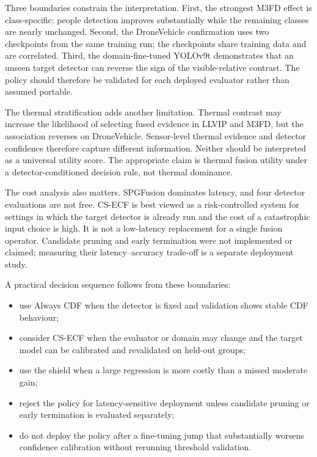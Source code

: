\documentclass[preprint,11pt]{elsarticle}
\begin{document}
Three boundaries constrain the interpretation. First, the strongest M3FD effect
is class-specific: people detection improves substantially while the remaining
classes are nearly unchanged. Second, the DroneVehicle confirmation uses two
checkpoints from the same training run; the checkpoints share training data and
are correlated. Third, the domain-fine-tuned YOLOv9t demonstrates that an
unseen target detector can reverse the sign of the visible-relative contrast.
The policy should therefore be validated for each deployed evaluator rather
than assumed portable.

The thermal stratification adds another limitation. Thermal contrast may
increase the likelihood of selecting fused evidence in LLVIP and M3FD, but the
association reverses on DroneVehicle. Sensor-level thermal evidence and
detector confidence therefore capture different information. Neither should be
interpreted as a universal utility score. The appropriate claim is thermal
fusion utility under a detector-conditioned decision rule, not thermal dominance.

The cost analysis also matters. SPGFusion dominates latency, and four detector
evaluations are not free. CS-ECF is best viewed as a risk-controlled system for
settings in which the target detector is already run and the cost of a
catastrophic input choice is high. It is not a low-latency replacement for a
single fusion operator. Candidate pruning and early termination were not
implemented or claimed; measuring their latency--accuracy trade-off is a
separate deployment study.

A practical decision sequence follows from these boundaries:
\begin{itemize}
  \item use Always CDF when the detector is fixed and validation shows stable
  CDF behaviour;
  \item consider CS-ECF when the evaluator or domain may change and the target
  model can be calibrated and revalidated on held-out groups;
  \item use the shield when a large regression is more costly than a missed
  moderate gain;
  \item reject the policy for latency-sensitive deployment unless candidate
  pruning or early termination is evaluated separately;
  \item do not deploy the policy after a fine-tuning jump that substantially
  worsens confidence calibration without rerunning threshold validation.
\end{itemize}
\end{document}
